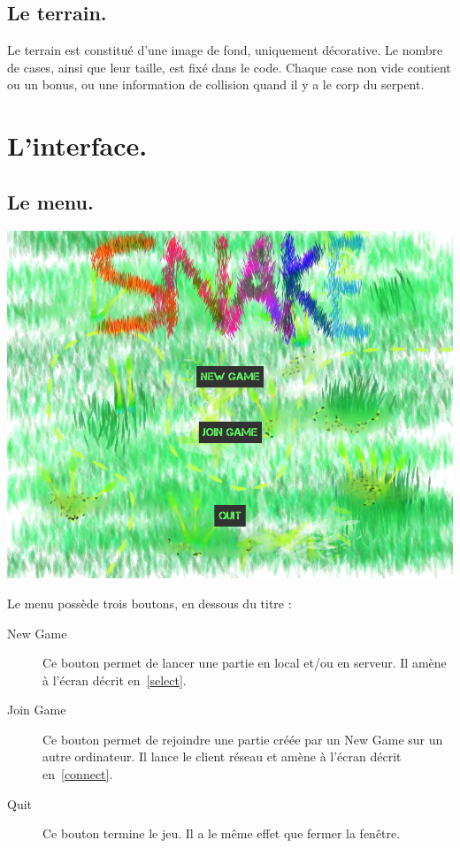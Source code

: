 \documentclass{article}
\begin{document}
\subsection{Le terrain.}
Le terrain est constitué d'une image de fond, uniquement décorative. Le nombre de cases, ainsi que leur taille, est fixé dans le code. Chaque case non vide contient ou un bonus, ou une information de collision quand il y a le corp du serpent.

\section{L'interface.}
\subsection{Le menu.} \label{menu}
\begin{center}
	\includegraphics[scale=0.4]{img/menu.png}
\end{center}
Le menu possède trois boutons, en dessous du titre :
\begin{description}
	\item[New Game] Ce bouton permet de lancer une partie en local et/ou en serveur. Il amène à l'écran décrit en~\ref{select}.
	\item[Join Game] Ce bouton permet de rejoindre une partie créée par un New Game sur un autre ordinateur. Il lance le client réseau et amène à l'écran décrit en~\ref{connect}.
	\item[Quit] Ce bouton termine le jeu. Il a le même effet que fermer la fenêtre.
\end{description}
\end{document}
